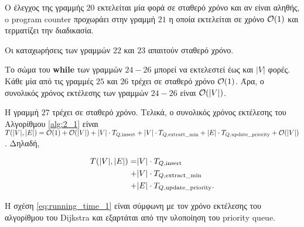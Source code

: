 Ο έλεγχος της γραμμής $20$ εκτελείται μία φορά σε σταθερό χρόνο και αν είναι αληθής, o program counter προχωράει στην γραμμή $21$ η οποία εκτελείται σε χρόνο $\mathcal{O}(1)$ και τερματίζει την διαδικασία.\par

Οι καταχωρήσεις των γραμμών $22$ και $23$ απαιτούν σταθερό χρόνο.\par

Το σώμα του \textbf{while} των γραμμών $24-26$ μπορεί να εκτελεστεί έως και $|V|$ φορές. Κάθε μία από τις γραμμές $25$ και $26$ τρέχει σε σταθερό χρόνο $\mathcal{O}(1)$. Άρα, ο συνολικός χρόνος εκτέλεσης των γραμμών $24-26$ είναι $\mathcal{O}(|V|)$. \par

Η γραμμή $27$ τρέχει σε σταθερό χρόνο. Τελικά, ο συνολικός χρόνος εκτέλεσης του Αλγορίθμου \ref{alg:2_1} είναι $T(|V|,|E|)=\mathcal{O}(1)+\mathcal{O}(|V|)+|V|\cdot T_{Q,\text{{insert}}}+|V|\cdot T_{Q,\text{{extract\_min}}}+|E|\cdot T_{Q,\text{{update\_priority}}}+\mathcal{O}(|V|)$. Δηλαδή,

\begin{equation}
\label{eq:running_time_1}
\begin{split}
    T(|V|,|E|)=&|V|\cdot T_{Q,\text{{insert}}}\\+&|V|\cdot T_{Q,\text{{extract\_min}}}\\+&|E|\cdot T_{Q,\text{{update\_priority}}}.
\end{split}
\end{equation}

Η σχέση \eqref{eq:running_time_1} είναι σύμφωνη με τον χρόνο εκτέλεσης του αλγορίθμου του Dijkstra και εξαρτάται από την υλοποίηση του priority queue.